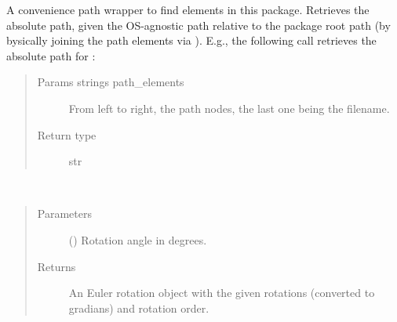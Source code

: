 \documentclass[letterpaper,10pt,english,openany,oneside]{sphinxmanual}
\begin{document}
\begin{fulllineitems}
\label{\detokenize{io_anim_mvnx:io_anim_mvnx.utils.resolve_path}}
A convenience path wrapper to find elements in this package. Retrieves
the absolute path, given the OS-agnostic path relative to the package
root path (by bysically joining the path elements via ).
E.g., the following call retrieves the absolute path for
:

\begin{sphinxVerbatim}[commandchars=\\\{\}]
  
\end{sphinxVerbatim}
\begin{quote}\begin{description}
\item[{Params strings path\_elements}] \leavevmode
From left to right, the path nodes,
the last one being the filename.

\item[{Return type}] \leavevmode
str

\end{description}\end{quote}

\end{fulllineitems}


\begin{fulllineitems}
\label{\detokenize{io_anim_mvnx:io_anim_mvnx.utils.rot_euler_degrees}}~\begin{quote}\begin{description}
\item[{Parameters}] \leavevmode
{} () \textendash{} Rotation angle in degrees.

\item[{Returns}] \leavevmode
An Euler rotation object with the given rotations (converted to
gradians) and rotation order.

\end{description}\end{quote}

\end{fulllineitems}
\end{document}
